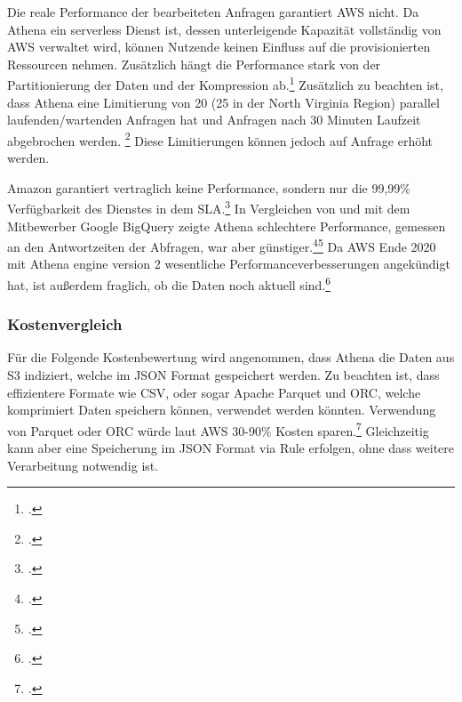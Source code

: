 Die reale Performance der bearbeiteten Anfragen garantiert \ac{AWS} nicht. Da Athena ein serverless Dienst ist, dessen unterleigende Kapazität vollständig von \ac{AWS} verwaltet wird, können Nutzende keinen Einfluss auf die provisionierten Ressourcen nehmen. Zusätzlich hängt die Performance stark von der Partitionierung der Daten und der Kompression ab.\footcite[Vgl.][]{Levy.2021} Zusätzlich zu beachten ist, dass Athena eine Limitierung von 20 (25 in der North Virginia Region) parallel laufenden/wartenden Anfragen hat und Anfragen nach 30 Minuten Laufzeit abgebrochen werden. \footcite[Vgl. auch im Folgenden][]{AmazonWebServicesInc..o.J.ac} Diese Limitierungen können jedoch auf Anfrage erhöht werden.

Amazon garantiert vertraglich keine Performance, sondern nur die 99,99\% Verfügbarkeit des Dienstes in dem \ac{SLA}.\footcite[Vgl.][]{AmazonWebServicesInc..2019c} In Vergleichen von \citeauthor{Levy.2019} und \citeauthor{Khadtare.2018} mit dem Mitbewerber Google BigQuery zeigte Athena schlechtere Performance, gemessen an den Antwortzeiten der Abfragen, war aber günstiger.\footcite[Vgl.][]{Levy.2019}\nzitat\footcite[Vgl.][]{Khadtare.2018} Da \ac{AWS} Ende 2020 mit Athena engine version 2 wesentliche Performanceverbesserungen angekündigt hat, ist außerdem fraglich, ob die Daten noch aktuell sind.\footcite[Vgl.][]{AmazonWebServicesInc..2020c}

\subsubsection{Kostenvergleich}
Für die Folgende Kostenbewertung wird angenommen, dass Athena die Daten aus \ac{S3} indiziert, welche im \ac{JSON} Format gespeichert werden. Zu beachten ist, dass effizientere Formate wie CSV, oder sogar Apache Parquet und ORC, welche komprimiert Daten speichern können, verwendet werden  könnten. Verwendung von Parquet oder ORC würde laut \ac{AWS} 30-90\% Kosten sparen.\footcite[Vgl.][]{AmazonWebServicesInc..o.J.t} Gleichzeitig kann aber eine Speicherung im \ac{JSON} Format via \AWSIOT{} Rule erfolgen, ohne dass weitere Verarbeitung notwendig ist.


